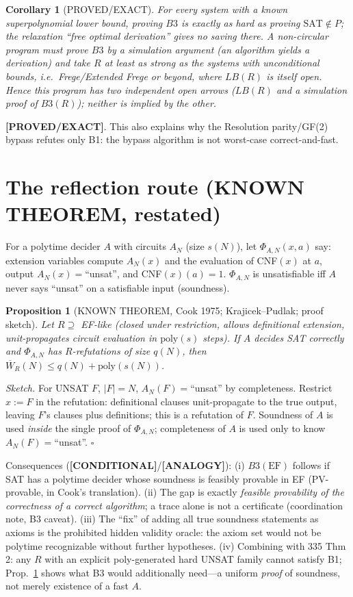 \documentclass[11pt]{article}
\newtheorem{proposition}[theorem]{Proposition}
\newtheorem{corollary}[theorem]{Corollary}
\theoremstyle{remark}
\newcommand{\status}[1]{\textbf{[#1]}}
\newcommand{\W}{\overline W}
\begin{document}
\begin{corollary}[PROVED/EXACT]
For every system with a known superpolynomial lower bound, \emph{proving $B3$ is exactly as hard as proving $\mathrm{SAT}\notin P$}; the
relaxation ``free optimal derivation'' gives no saving there. A non-circular program must prove $B3$ by a \emph{simulation} argument
(an algorithm yields a derivation) and take $R$ at least as strong as the systems with unconditional bounds, i.e.\ Frege/Extended Frege
or beyond, where $LB(R)$ is itself open. Hence this program has two independent open arrows ($LB(R)$ and a simulation proof of $B3(R)$);
neither is implied by the other.
\end{corollary}
\status{PROVED/EXACT}. This also explains why the Resolution parity/GF(2) bypass refutes only B1: the bypass algorithm is not worst-case correct-and-fast.

\section{The reflection route (KNOWN THEOREM, restated)}
For a polytime decider $A$ with circuits $A_N$ (size $s(N)$), let $\Phi_{A,N}(x,a)$ say: extension variables compute $A_N(x)$ and the evaluation of CNF$(x)$ at $a$,
output $A_N(x)=$``unsat'', and CNF$(x)(a)=1$. $\Phi_{A,N}$ is unsatisfiable iff $A$ never says ``unsat'' on a satisfiable input (soundness).
\begin{proposition}[KNOWN THEOREM, Cook 1975; Krajicek--Pudlak; proof sketch]\label{p:refl}
Let $R\supseteq$ EF-like (closed under restriction, allows definitional extension, unit-propagates circuit evaluation in $\mathrm{poly}(s)$ steps).
If $A$ decides SAT correctly and $\Phi_{A,N}$ has $R$-refutations of size $q(N)$, then $\W_R(N)\le q(N)+\mathrm{poly}(s(N))$.
\end{proposition}
\emph{Sketch.} For UNSAT $F$, $|F|=N$, $A_N(F)=$``unsat'' by completeness. Restrict $x:=F$ in the refutation: definitional clauses unit-propagate to the
true output, leaving $F$'s clauses plus definitions; this is a refutation of $F$. Soundness of $A$ is used \emph{inside} the single proof of $\Phi_{A,N}$;
completeness of $A$ is used only to know $A_N(F)=$``unsat''. $\square$

Consequences (\status{CONDITIONAL}/\status{ANALOGY}): (i) $B3(\mathrm{EF})$ follows if SAT has a polytime decider whose soundness is feasibly
provable in EF (PV-provable, in Cook's translation). (ii) The gap is exactly \emph{feasible provability of the correctness of a correct algorithm}; a trace alone is not a certificate (coordination note, B3 caveat). (iii) The ``fix'' of adding all true soundness statements as axioms is the prohibited hidden validity oracle: the axiom set would not be polytime recognizable without further hypotheses. (iv) Combining with 335 Thm 2: any $R$ with an explicit poly-generated hard UNSAT family cannot satisfy B1; Prop.~\ref{p:refl} shows what B3 would additionally need---a uniform \emph{proof} of soundness, not merely existence of a fast $A$.
\end{document}
